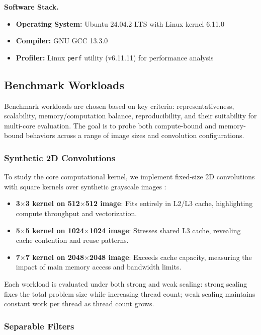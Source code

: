 \documentclass[conference, 10pt]{IEEEtran}
\begin{document}
\textbf{Software Stack.}
\begin{itemize}
    \item \textbf{Operating System:} Ubuntu 24.04.2 LTS with Linux kernel 6.11.0
    \item \textbf{Compiler:} GNU GCC 13.3.0
    \item \textbf{Profiler:} Linux \texttt{perf} utility (v6.11.11) for performance analysis
\end{itemize}



\subsection{Benchmark Workloads}

Benchmark workloads are chosen based on key criteria: representativeness, scalability, memory/computation balance, reproducibility, and their suitability for multi-core evaluation. The goal is to probe both compute-bound and memory-bound behaviors across a range of image sizes and convolution configurations.

\subsubsection{Synthetic 2D Convolutions}

To study the core computational kernel, we implement fixed-size 2D convolutions with square kernels over synthetic grayscale images \cite{Tousimojarad_Vanderbauwhede_Cockshott_2017}:

\begin{itemize}
    \item \textbf{3$\times$3 kernel on 512$\times$512 image}: Fits entirely in L2/L3 cache, highlighting compute throughput and vectorization.
    \item \textbf{5$\times$5 kernel on 1024$\times$1024 image}: Stresses shared L3 cache, revealing cache contention and reuse patterns.
    \item \textbf{7$\times$7 kernel on 2048$\times$2048 image}: Exceeds cache capacity, measuring the impact of main memory access and bandwidth limits.
\end{itemize}

Each workload is evaluated under both strong and weak scaling: strong scaling fixes the total problem size while increasing thread count; weak scaling maintains constant work per thread as thread count grows.

\subsubsection{Separable Filters}
\end{document}

